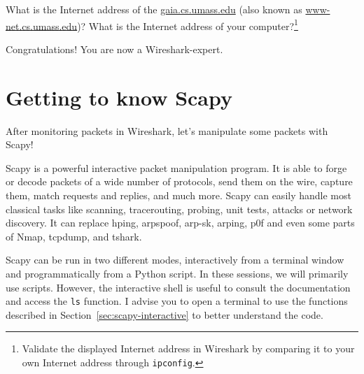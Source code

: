 \documentclass[11pt,a4paper]{article}
\begin{document}
\begin{question}
    What is the Internet address of the \url{gaia.cs.umass.edu} (also known as \url{www-net.cs.umass.edu})? What is the Internet address of your computer?\footnote{Validate the displayed Internet address in Wireshark by comparing it to your own Internet address through \texttt{ipconfig}.}
\end{question}

Congratulations! You are now a Wireshark-expert.

\FloatBarrier
\section{Getting to know Scapy}
After monitoring packets in Wireshark, let's manipulate some packets with Scapy!

Scapy is a powerful interactive packet manipulation program. It is able to forge or decode packets of a wide number of protocols, send them on the wire, capture them, match requests and replies, and much more. Scapy can easily handle most classical tasks like scanning, tracerouting, probing, unit tests, attacks or network discovery. It can replace hping, arpspoof, arp-sk, arping, p0f and even some parts of Nmap, tcpdump, and tshark.

Scapy can be run in two different modes, interactively from a terminal window and programmatically from a Python script. 
In these sessions, we will primarily use scripts. However, the interactive shell is useful to consult the documentation and  access the \texttt{ls} function. I advise you to open a terminal to use the functions described in Section~\ref{sec:scapy-interactive} to better understand the code.
\end{document}
